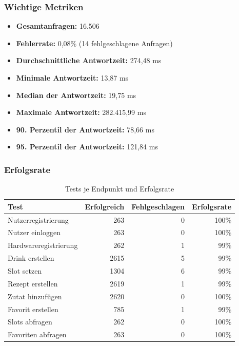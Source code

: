 \subsubsection*{Wichtige Metriken}
\begin{itemize}
    \item \textbf{Gesamtanfragen:} 16.506
    \item \textbf{Fehlerrate:} 0,08\% (14 fehlgeschlagene Anfragen)
    \item \textbf{Durchschnittliche Antwortzeit:} 274,48 ms
    \item \textbf{Minimale Antwortzeit:} 13,87 ms
    \item \textbf{Median der Antwortzeit:} 19,75 ms
    \item \textbf{Maximale Antwortzeit:} 282.415,99 ms
    \item \textbf{90. Perzentil der Antwortzeit:} 78,66 ms
    \item \textbf{95. Perzentil der Antwortzeit:} 121,84 ms
\end{itemize}

\subsubsection*{Erfolgsrate}

\begin{table}[H]
    \centering
        \begin{tabular}{|l|r|r|r|}
            \hline
            \textbf{Test} & \textbf{Erfolgreich} & \textbf{Fehlgeschlagen} & \textbf{Erfolgsrate} \\
            \hline
            Nutzerregistrierung   &  263 &   0 &  100\% \\
            Nutzer einloggen      &  263 &   0 &  100\% \\
            Hardwareregistrierung &  262 &   1 &   99\% \\
            Drink erstellen       & 2615 &   5 &   99\% \\
            Slot setzen           & 1304 &   6 &   99\% \\
            Rezept erstellen      & 2619 &   1 &   99\% \\
            Zutat hinzufügen      & 2620 &   0 &  100\% \\
            Favorit erstellen     &  785 &   1 &   99\% \\
            Slots abfragen        &  262 &   0 &  100\% \\
            Favoriten abfragen    &  263 &   0 &  100\% \\
            \hline
        \end{tabular}
    \caption{Tests je Endpunkt und Erfolgsrate}
    \label{tab:test_success_rate}    
\end{table}

